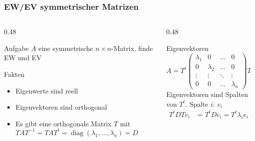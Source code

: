 %
%
%
\begin{frame}
\frametitle{EW/EV symmetrischer Matrizen}
\begin{columns}[t]
\begin{column}{0.48\hsize}
\begin{block}{Aufgabe}
$A$ eine symmetrische $n\times n$-Matrix, finde
EW und EV
\end{block}
\begin{block}{Fakten}
\begin{itemize}
\item Eigenwerte sind reell
\item Eigenvektoren sind orthogonal
\item Es gibt eine orthogonale Matrix $T$ mit $TAT^{-1}=TAT^t=
\operatorname{diag}(\lambda_1,\dots,\lambda_n)=D$
\end{itemize}
\end{block}
\end{column}
\begin{column}{0.48\hsize}
\begin{block}{Eigenvektoren}
\[
A = T^t\begin{pmatrix}
\lambda_1&    0    &\dots &   0   \\
    0    &\lambda_2&\dots &   0   \\
 \vdots  & \vdots  &\ddots&\vdots \\
    0    &    0    &\dots &\lambda_n
\end{pmatrix}T
=
T^tDT
\]
Eigenvektoren sind Spalten von $T^t$.
Spalte $i$: $v_i$
\begin{align*}
T^tDTv_i
&=
T^tDe_i
=
T^t\lambda_ie_i
=
\lambda_iv_i
\end{align*}
\end{block}
\end{column}
\end{columns}
\end{frame}

